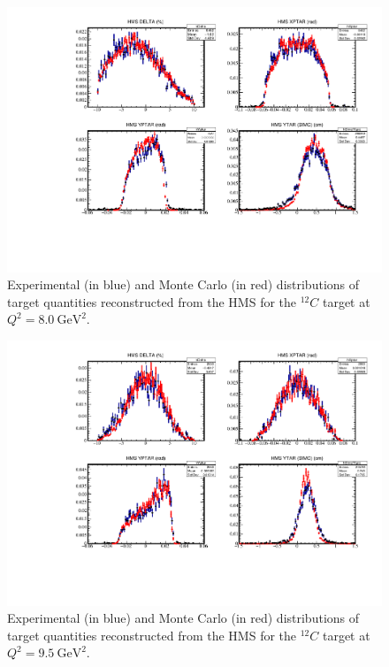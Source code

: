 \begin{figure}[!h]
    \centering
    \includegraphics[page=1,width=1.0\textwidth]{pass5_report/Report_c12_8.pdf}
    \caption{
            Experimental (in blue) and Monte Carlo (in red) distributions of
            target quantities reconstructed from the HMS for
            the ${}^{12}C$ target at $Q^2=\SI{8.0}{\giga\electronvolt\squared}$.
            }
    \label{fig:Report_c12_8.pdf}
\end{figure}


\begin{figure}[!h]
    \centering
    \includegraphics[page=1,width=1.0\textwidth]{pass5_report/Report_c95.pdf}
    \caption{
            Experimental (in blue) and Monte Carlo (in red) distributions of
            target quantities reconstructed from the HMS for
            the ${}^{12}C$ target at $Q^2=\SI{9.5}{\giga\electronvolt\squared}$.
            }
    \label{fig:Report_c95.pdf}
\end{figure}


